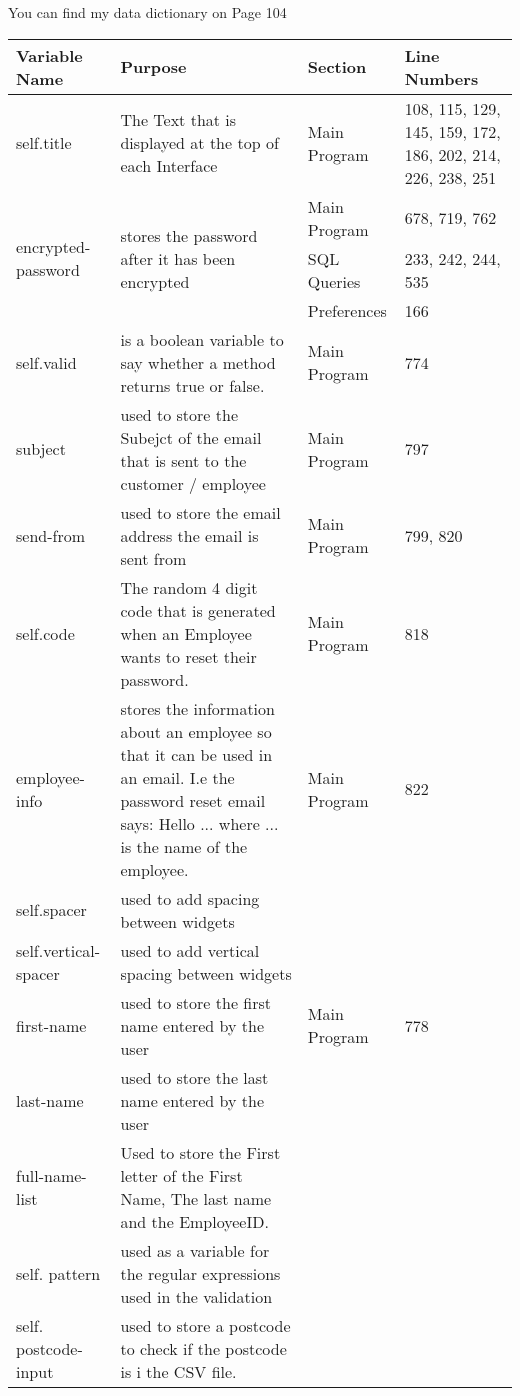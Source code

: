 You can find my data dictionary on Page 104 
\begin{center}
    \begin{tabular}{|p{1.5cm}|p{4.5cm}|p{1.5cm}|p{3cm}|}
        \hline
        \textbf{Variable Name} & \textbf{Purpose} & \textbf{Section} & \textbf{Line Numbers}\\ \hline
	self.title & The Text that is displayed at the top of each Interface & Main Program & 108, 115, 129, 145, 159, 172, 186, 202, 214, 226, 238, 251 \\ \hline
	\multirow{3}{*}{encrypted-password} & \multirow{3}{*}{stores the password after it has been encrypted} & Main Program & 678, 719, 762 \\ 
	& & SQL Queries & 233, 242, 244, 535 \\
	& & Preferences & 166 \\ 
	self.valid & is a boolean variable to say whether a method returns true or false. & Main Program &  774 \\ \hline
	subject & used to store the Subejct of the email that is sent to the customer / employee & Main Program & 797 \\ \hline
	send-from & used to store the email address the email is sent from & Main Program & 799, 820 \\ \hline
	self.code & The random 4 digit code that is generated when an Employee wants to reset their password. & Main Program & 818 \\ \hline
	employee-info & stores the information about an employee so that it can be used in an email. I.e the password reset email says: Hello ... where ... is the name of the employee. & Main Program & 822 \\ \hline
	self.spacer & used to add spacing between widgets & & \\ \hline
	self.vertical-spacer& used to add vertical spacing between widgets & & \\ \hline
	first-name & used to store the first name entered by the user & Main Program & 778 \\ \hline
	last-name & used to store the last name entered by the user & & \\ \hline
	full-name-list & Used to store the First letter of the First Name, The last name and the EmployeeID. & & \\ \hline
	self. pattern & used as a variable for the regular expressions used in the validation & & \\ \hline
	self. postcode-input & used to store a postcode to check if the postcode is i the CSV file. & & \\ \hline

\end{tabular}
\end{center}
